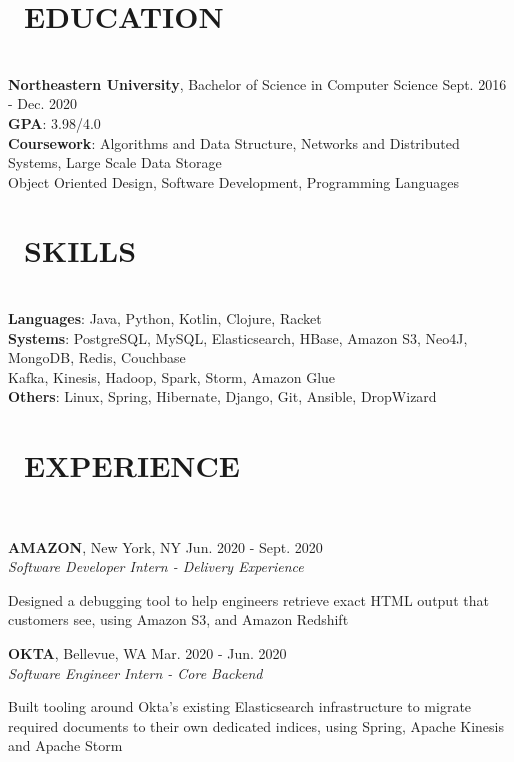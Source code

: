 \documentclass[11pt]{res}
\newcommand{\sectionunderline}{\vspace{-3mm}\hrulefill\\}
\newcommand{\listingtab}{\tabto{2.8cm}}
\newcommand{\newsect}[1]{\section{\Large \bf #1}}
\newcommand{\email}[1]{\faEnvelope\hspace{1mm} \href{mailto:#1}{#1}}
\newcommand{\github}[1]{\faGithubAlt\hspace{1mm} \href{https://github.com/#1}{#1}}
\newcommand{\linkedin}[1]{\faLinkedinSquare\hspace{1mm} \href{https://linkedin.com/in/#1}{#1}}
\begin{document}
\address{
  \large\email{derekpham67@gmail.com}\:
  \large{$\bullet$}
  \large\github{derekpham}\:
  \large{$\bullet$}
  \large\linkedin{derek-pham97}\\
}

\begin{resume}
  \newsect{\faGraduationCap\ EDUCATION}{
    \sectionunderline{
      {\bf Northeastern University}, Bachelor of Science in Computer Science \hfill Sept. 2016 - Dec. 2020\\
      {\bf GPA}: \listingtab 3.98/4.0\\
      {\bf Coursework}: \listingtab Algorithms and Data Structure, Networks and Distributed Systems, Large Scale Data Storage\\
      \listingtab Object Oriented Design, Software Development, Programming Languages
    }
  }

  \newsect{\faCogs\ SKILLS}{
    \sectionunderline{
      {\bf Languages}: \listingtab Java, Python, Kotlin, Clojure, Racket\\
      {\bf Systems}: \listingtab PostgreSQL, MySQL, Elasticsearch, HBase, Amazon S3, Neo4J, MongoDB, Redis, Couchbase\\
      \listingtab Kafka, Kinesis, Hadoop, Spark, Storm, Amazon Glue\\
      {\bf Others}: \listingtab Linux, Spring, Hibernate, Django, Git, Ansible, DropWizard
    }
  }

  \newsect{\faUsers\ EXPERIENCE}{
    \sectionunderline{
      {\bf AMAZON}, New York, NY \hfill Jun. 2020 - Sept. 2020\\
      {\it Software Developer Intern - Delivery Experience}
      \begin{itemize}
        {\item Designed a debugging tool to help engineers retrieve exact HTML output that customers see, using Amazon S3, and Amazon Redshift}
      \end{itemize}

      {\bf OKTA}, Bellevue, WA \hfill Mar. 2020 - Jun. 2020\\
      {\it Software Engineer Intern - Core Backend}
      \begin{itemize}
        {\item Built tooling around Okta's existing Elasticsearch infrastructure  to migrate required documents to their own dedicated indices, using Spring, Apache Kinesis and Apache Storm}
      \end{itemize}

}}
\end{resume}
\end{document}
